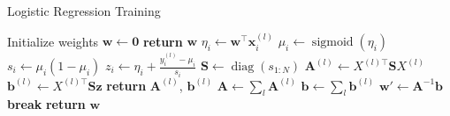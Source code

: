 \documentclass[10pt]{article}
\DeclareMathOperator*{\sigmoid}{sigmoid}
\DeclareMathOperator*{\diag}{diag}
\begin{document}

\begin{algorithm}

  \caption{Logistic Regression Training}

  \begin{algorithmic}[1] %
                  \State Initialize weights $\mathbf{w} \gets \mathbf{0}$
                  \State \textbf{return} $\mathbf{w}$
          \EndProcedure
          \Loop
                   
                          \State $\eta_i \gets \mathbf{w}^{\top} \mathbf{x}_i^{(l)}$ 
                          \State $\mu_i \gets \sigmoid(\eta_i)$
                          \State $s_i \gets \mu_i (1 - \mu_i)$
                          \State $z_i \gets \eta_i + \frac{y_i^{(l)} - \mu_i}{s_i}$
                          \State $\mathbf{S} \gets \diag(s_{1:N})$
                          \State $\mathbf{A}^{(l)} \gets X^{(l)\top} \mathbf{S} X^{(l)}$
                          \State $\mathbf{b}^{(l)} \gets X^{(l)\top} \mathbf{S} \mathbf{z}$
                          \State \textbf{return} $\mathbf{A}^{(l)}$, $\mathbf{b}^{(l)}$
                  \EndProcedure
                          \State $\mathbf{A} \gets \sum_l \mathbf{A}^{(l)}$
                          \State $\mathbf{b} \gets \sum_l \mathbf{b}^{(l)}$
                          \State $\mathbf{w'} \gets \mathbf{A}^{-1} \mathbf{b}$
                                  \State \textbf{break}
                          \EndIf
                          \State \textbf{return} $\mathbf{w}$
                  \EndProcedure
          \EndLoop
  \end{algorithmic}

\end{algorithm}
\end{document}
